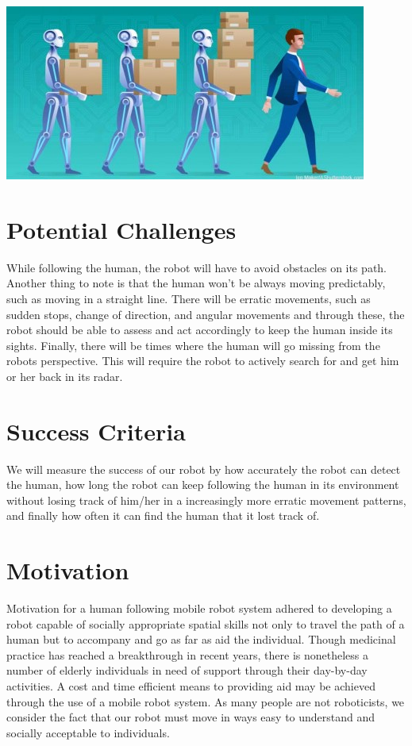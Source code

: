 \documentclass{ndjflart}
\theoremstyle{definition}
\theoremstyle{remark}
\begin{document}
\begin{center}
	\includegraphics[width=0.5\columnwidth]{robotsfollowhuman-450x218.jpg} %
\end{center}

\section{Potential Challenges}\label{front}
While following the human, the robot will have to avoid obstacles on its path. Another thing to note is that the human won’t be always moving predictably, such as moving in a straight line. There will be erratic movements, such as sudden stops, change of direction, and angular movements and through these, the robot should be able to assess and act accordingly to keep the human inside its sights. Finally, there will be times where the human will go missing from the robots perspective. This will require the robot to actively search for and get him or her back in its radar.

\section{Success Criteria}\label{secs} We will measure the success of our robot by how accurately the robot can detect the human, how long the robot can keep following the human in its environment without losing track of him/her in a increasingly more erratic movement patterns, and finally how often it can find the human that it lost track of.


\section{Motivation}\label{style} 

Motivation for a human following mobile robot system adhered to developing a robot capable of socially appropriate spatial skills not only to travel the path of a human but to accompany and go as far as aid the individual. Though medicinal practice has reached a breakthrough in recent years, there is nonetheless a number of elderly individuals in need of support through their day-by-day activities. A cost and time efficient means to providing aid may be achieved through the use of a mobile robot system. As many people are not roboticists, we consider the fact that our robot must move in ways easy to understand and socially acceptable to individuals.  
\end{document}
